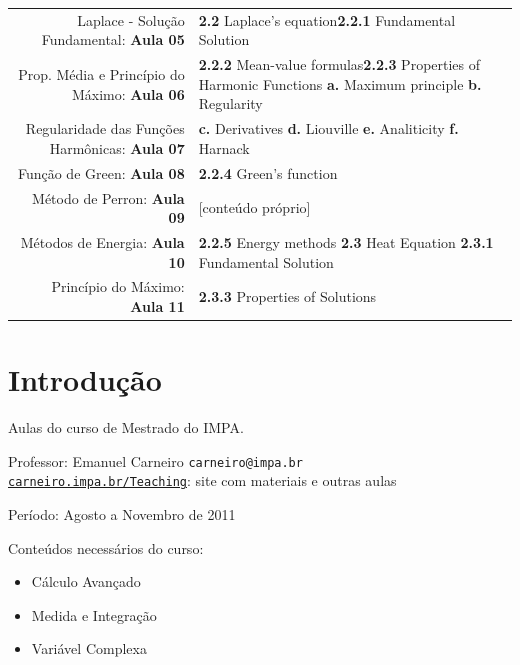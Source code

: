 \documentclass[11pt]{article}
\begin{document}
\begin{center}
	\begin{tabular}{r | p{8.5cm}}
		Laplace - Solução Fundamental: \textbf{Aula 05} & \textbf{2.2} Laplace's equation\newline \textbf{2.2.1} Fundamental Solution \\
		Prop. Média e Princípio do Máximo: \textbf{Aula 06} & \textbf{2.2.2} Mean-value formulas\newline \textbf{2.2.3} Properties of Harmonic Functions \newline \textbf{a.} Maximum principle \newline \textbf{b.} Regularity \\
		
		Regularidade das Funções Harmônicas: \textbf{Aula 07} & \textbf{c.} Derivatives \newline \textbf{d.} Liouville \newline \textbf{e.} Analiticity \newline \textbf{f.} Harnack \\

		Função de Green: \textbf{Aula 08} & \textbf{2.2.4} Green's function \\

		Método de Perron: \textbf{Aula 09} & [conteúdo próprio] \\

		Métodos de Energia: \textbf{Aula 10} & \textbf{2.2.5} Energy methods \newline \textbf{2.3} Heat Equation \newline \textbf{2.3.1} Fundamental Solution \\
		Princípio do Máximo: \textbf{Aula 11} & \textbf{2.3.3} Properties of Solutions
	\end{tabular}
\end{center}



\section{Introdução}
Aulas do curso de Mestrado do IMPA.

Professor: Emanuel Carneiro \texttt{carneiro@impa.br} \\
\href{https://carneiro.impa.br/index.php/Teaching}{\texttt{carneiro.impa.br/Teaching}}: site com materiais e outras aulas

Período: Agosto a Novembro de 2011

Conteúdos necessários do curso:
\begin{itemize}
	\item Cálculo Avançado
	\item Medida e Integração
	\item Variável Complexa
\end{itemize}
\end{document}

